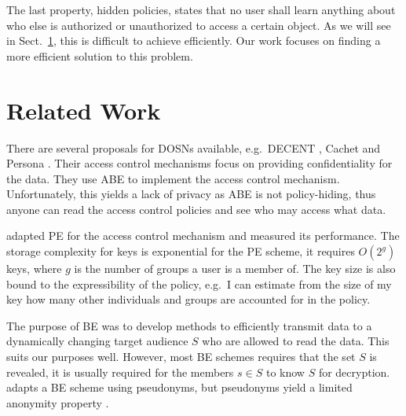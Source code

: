 The last property, hidden policies, states that no user shall learn anything 
about who else is authorized or unauthorized to access a certain object.
As we will see in Sect.~\ref{sec:RelatedWork}, this is difficult to achieve 
efficiently.
Our work focuses on finding a more efficient solution to this problem.


\section{Related Work}\label{sec:RelatedWork}

There are several proposals for \acp{DOSN} available, e.g.~DECENT
\cite{decent}, Cachet \cite{cachet} and Persona \cite{persona}.
Their access control mechanisms focus on providing confidentiality for the 
data.
They use \ac{ABE} \cite{abe} to implement the access control mechanism.
Unfortunately, this yields a lack of privacy as \ac{ABE} is not policy-hiding, 
thus anyone can read the access control policies and see who may access what 
data.

\citet{predicateac} adapted \ac{PE} for the access control mechanism and 
measured its performance.
The storage complexity for keys is exponential for the \ac{PE} scheme, it 
requires \(O(2^g)\) keys, where \(g\) is the number of groups a user is 
a member of.
The key size is also bound to the expressibility of the policy, e.g.~I can 
estimate from the size of my key how many other individuals and groups are 
accounted for in the policy.

The purpose of \ac{BE} \cite{broadcastenc} was to develop methods to 
efficiently transmit data to a dynamically changing target audience \(S\) who 
are allowed to read the data.
This suits our purposes well.
However, most \ac{BE} schemes requires that the set \(S\) is revealed, it is 
usually required for the members \(s\in S\) to know \(S\) for decryption.
\citet{gunther2012cryptographic} adapts a \ac{BE} scheme using pseudonyms, but 
pseudonyms yield a limited anonymity property \cite{gunther2012cryptographic}.

